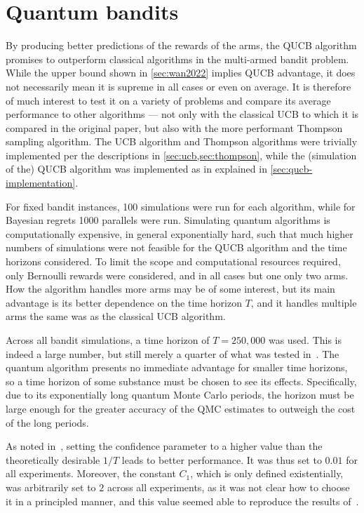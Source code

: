 \section{Quantum bandits}
By producing better predictions of the rewards of the arms, the QUCB algorithm promises to outperform classical algorithms in the multi-armed bandit problem.
While the upper bound shown in \cref{sec:wan2022} implies QUCB advantage, it does not necessarily mean it is supreme in all cases or even on average.
It is therefore of much interest to test it on a variety of problems and compare its average performance to other algorithms — not only with the classical UCB to which it is compared in the original paper, but also with the more performant Thompson sampling algorithm.
The UCB algorithm and Thompson algorithms were trivially implemented per the descriptions in \cref{sec:ucb,sec:thompson}, while the (simulation of the) QUCB algorithm was implemented as in explained in \cref{sec:qucb-implementation}.

For fixed bandit instances, 100 simulations were run for each algorithm, while for Bayesian regrets 1000 parallels were run.
Simulating quantum algorithms is computationally expensive, in general exponentially hard, such that much higher numbers of simulations were not feasible for the QUCB algorithm and the time horizons considered.
To limit the scope and computational resources required, only Bernoulli rewards were considered, and in all cases but one only two arms.
How the algorithm handles more arms may be of some interest, but its main advantage is its better dependence on the time horizon $T$, and it handles multiple arms the same was as the classical UCB algorithm.

Across all bandit simulations, a time horizon of $T=250,000$ was used.
This is indeed a large number, but still merely a quarter of what was tested in~\autocite{wan2022}.
The quantum algorithm presents no immediate advantage for smaller time horizons, so  a time horizon of some substance must be chosen to see its effects.
Specifically, due to its exponentially long quantum Monte Carlo periods, the horizon must be large enough for the greater accuracy of the QMC estimates to outweigh the cost of the long periods.

As noted in~\autocite{wan2022}, setting the confidence parameter to a higher value than the theoretically desirable $1/T$ leads to better performance.
It was thus set to $0.01$ for all experiments.
Moreover, the constant $C_1$, which is only defined existentially, was arbitrarily set to $2$ across all experiments, as it was not clear how to choose it in a principled manner, and this value seemed able to reproduce the results of~\autocite{wan2022}.

